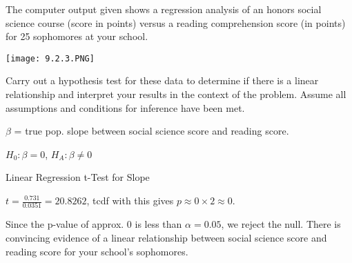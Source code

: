 \documentclass[../stats.tex]{subfiles}
\begin{document}
\pagebreak
\begin{example}
    The computer output given shows a regression analysis of an honors social science course (score in points) versus a reading comprehension score (in points) for 25 sophomores at your school.
    \begin{center}
        \texttt{[image: 9.2.3.PNG]}
    \end{center}
    Carry out a hypothesis test for these data to determine if there is a linear relationship and interpret your results in the context of the problem. Assume all assumptions and conditions for inference have been met.

    $\beta$ = true pop. slope between social science score and reading score. 

    $H_0:\beta = 0$, $H_A:\beta\neq 0$

    Linear Regression t-Test for Slope

    $t=\frac{0.731}{0.0351}=20.8262$, tcdf with this gives $p\approx 0\times 2 \approx 0$.

    Since the p-value of approx. 0 is less than $\alpha = 0.05$, we reject the null. There is convincing evidence of a linear relationship between social science score and reading score for your school's sophomores.
\end{example}
\end{document}
